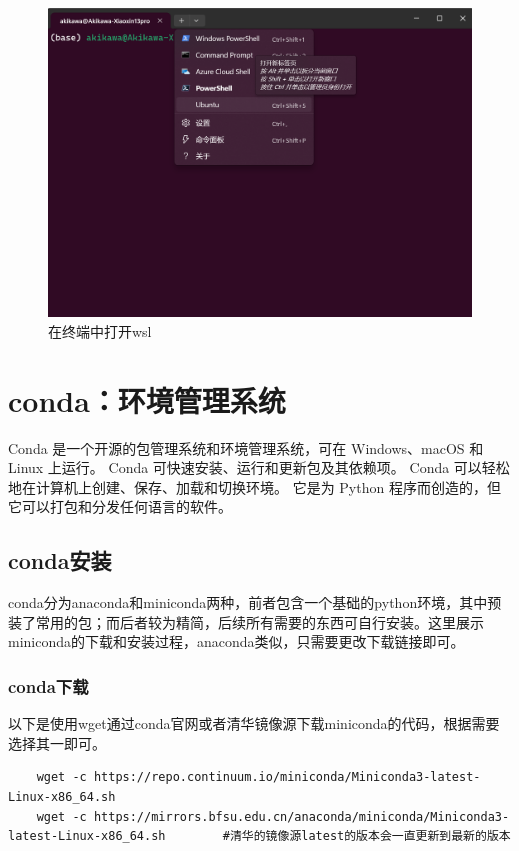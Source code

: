 \begin{figure}[ht]
    \centering
    \includegraphics[width=13cm]{image/env/wsl-ubuntu.png}
    \caption{在终端中打开wsl}
    \label{ubuntu}
\end{figure}

\section{conda：环境管理系统}
Conda 是一个开源的包管理系统和环境管理系统，可在 Windows、macOS 和 Linux 上运行。 Conda 可快速安装、运行和更新包及其依赖项。 Conda 可以轻松地在计算机上创建、保存、加载和切换环境。 它是为 Python 程序而创造的，但它可以打包和分发任何语言的软件。

\subsection{conda安装}
conda分为anaconda和miniconda两种，前者包含一个基础的python环境，其中预装了常用的包；而后者较为精简，后续所有需要的东西可自行安装。这里展示miniconda的下载和安装过程，anaconda类似，只需要更改下载链接即可。

\subsubsection{conda下载}
以下是使用wget通过conda官网或者清华镜像源下载miniconda的代码，根据需要选择其一即可。
\begin{lstlisting}
    wget -c https://repo.continuum.io/miniconda/Miniconda3-latest-Linux-x86_64.sh
    wget -c https://mirrors.bfsu.edu.cn/anaconda/miniconda/Miniconda3-latest-Linux-x86_64.sh        #清华的镜像源latest的版本会一直更新到最新的版本
\end{lstlisting}

